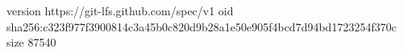 version https://git-lfs.github.com/spec/v1
oid sha256:c323f977f3900814c3a45b0c820d9b28a1e50e905f4bcd7d94bd1723254f370c
size 87540
